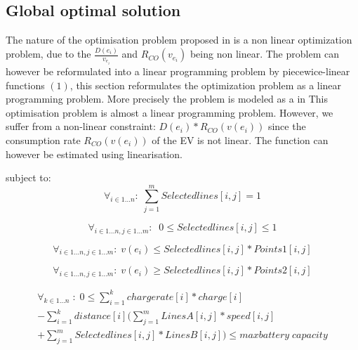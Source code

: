 \subsection{Global optimal solution}
The nature of the optimisation problem proposed in  is a non linear optimization problem, due to the $\frac{D(e_i)}{v_{e_i}}$ and $R_{CO}(v_{e_i})$ being non linear. The problem can however be reformulated into a linear programming problem by piecewice-linear functions $(1)$, this section reformulates the optimization problem as a linear programming problem. More precisely the problem is modeled as a in  
This optimisation problem is almost a linear programming problem. However, we suffer from a non-linear constraint: $D(e_i)*R_{CO}(v(e_i))$ since the consumption rate $R_{CO}(v(e_i))$ of the EV is not linear. The function can however be estimated using linearisation. 

subject to: 
\begin{equation}
\forall_{i\in1 \dots n }:\; \sum_{j=1}^{m} Selectedlines[i,j] = 1
\end{equation}

\begin{equation}
\forall_{i\in1 \dots n, j \in 1 \dots m}: \; \;0\leq Selectedlines[i,j] \leq 1
\end{equation}

\begin{equation}
\forall_{i\in1 \dots n, j \in 1 \dots m}:\; v(e_i) \le Selectedlines[i,j] * Points1[i,j]
\end{equation}

\begin{equation}
\forall_{i\in1 \dots n, j \in 1 \dots m}:\; v(e_i) \ge Selectedlines[i,j] * Points2[i,j]
\end{equation}

\begin{equation}
\begin{split}
\forall_{k\in1 \dots n}\;:\;0 \le\sum_{i=1}^{k}chargerate[i]*charge[i]\\
-\sum_{i=1}^{k} distance[i](\sum_{j=1}^{m} LinesA[i,j]*speed[i,j]\\
+\sum_{j=1}^{m} Selectedlines[i,j]*LinesB[i,j]) \le maxbattery\;capacity
\end{split}
\end{equation}


